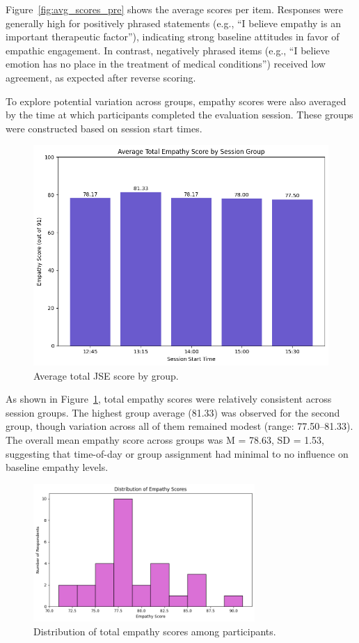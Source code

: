 Figure~\ref{fig:avg_scores_pre} shows the average scores per item. Responses were generally high for positively phrased statements (e.g., “I believe empathy is an important therapeutic factor”), indicating strong baseline attitudes in favor of empathic engagement. In contrast, negatively phrased items (e.g., “I believe emotion has no place in the treatment of medical conditions”) received low agreement, as expected after reverse scoring.

\vspace{1em}

To explore potential variation across groups, empathy scores were also averaged by the time at which participants completed the evaluation session. These groups were constructed based on session start times.

\begin{figure}[H]
    \centering
    \includegraphics[width=0.75\columnwidth]{../../Figures/avg score-by-group-pre.png}
    \caption{Average total JSE score by group.}
    \label{fig:group_scores_pre}
\end{figure}

As shown in Figure~\ref{fig:group_scores_pre}, total empathy scores were relatively consistent across session groups. The highest group average (81.33) was observed for the second group, though variation across all of them remained modest (range: 77.50–81.33). The overall mean empathy score across groups was M = 78.63, SD = 1.53, suggesting that time-of-day or group assignment had minimal to no influence on baseline empathy levels.

\begin{figure}[htbp]
    \centering
    \includegraphics[width=0.75\textwidth]{../../Figures/avg-scores-summary-pre.png}
    \caption{Distribution of total empathy scores among participants.}
    \label{fig:score_distribution_pre}
\end{figure}

